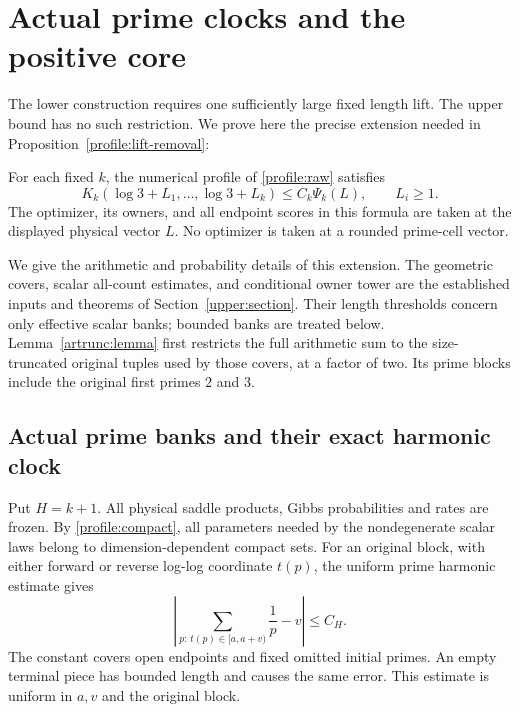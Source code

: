 
\section{Actual prime clocks and the positive core}
\label{positive:section}

The lower construction requires one sufficiently large fixed length lift.
The upper bound has no such restriction. We prove here the precise
extension needed in Proposition~\ref{profile:lift-removal}:
\begin{theorem}
\label{positive:upper}
For each fixed $k$, the numerical profile of
\eqref{profile:raw} satisfies
\begin{equation}
 K_k(\log3+L_1,\ldots,\log3+L_k)
       \leq C_k\Psi_k(L),\qquad L_i\geq1.
 \label{positive:claim}
\end{equation}
The optimizer, its owners, and all endpoint scores in this formula are
taken at the displayed physical vector $L$. No optimizer is taken at a
rounded prime-cell vector.
\end{theorem}

We give the arithmetic and probability details of this extension.
The geometric covers, scalar all-count estimates, and conditional owner
tower are the established inputs and theorems of
Section~\ref{upper:section}. Their length thresholds concern only
effective scalar banks; bounded banks are treated below.
Lemma~\ref{artrunc:lemma} first restricts the full arithmetic sum to the
size-truncated original tuples used by those covers, at a factor of two.
Its prime blocks include the original first primes $2$ and $3$.

\subsection{Actual prime banks and their exact harmonic clock}
Put $H=k+1$. All physical saddle products, Gibbs probabilities and rates
are frozen. By \eqref{profile:compact}, all parameters needed by the
nondegenerate scalar laws belong to dimension-dependent compact sets.
For an original block, with either forward or reverse log-log coordinate
$t(p)$, the uniform prime harmonic estimate gives
\begin{equation}
 \left|\sum_{p:\,t(p)\in[a,a+v)}\frac1p-v\right|\leq C_H.
 \label{positive:harmonic}
\end{equation}
The constant covers open endpoints and fixed omitted initial primes.
An empty terminal piece has bounded length and causes the same error.
This estimate is uniform in $a,v$ and the original block.

